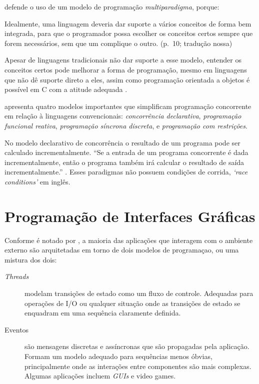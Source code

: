 \textcite{roy2009} defende o uso de um modelo de programação \emph{multiparadigma},
porque:

\begin{citacao}
  Idealmente, uma linguagem deveria dar suporte a vários conceitos de forma
  bem integrada, para que o programador possa escolher os conceitos certos
  sempre que forem necessários, sem que um complique o outro.
  (p.~10; tradução nossa)
\end{citacao}

Apesar de linguagens tradicionais não dar suporte a esse modelo, entender os
conceitos certos pode melhorar a forma de programação, mesmo em linguagens que
não dê suporte direto a eles, assim como programação orientada a objetos é
possível em C com a atitude adequada \cite{roy2009}.

\textcite{roy2009} apresenta quatro modelos importantes que simplificam
programação concorrente em relação à linguagens convencionais: \emph{concorrência
declarativa}, \emph{programação funcional reativa}, \emph{programação síncrona
discreta}, e \emph{programação com restrições}.

No modelo declarativo de concorrência o resultado de um programa pode ser
calculado incrementalmente.
“Se a entrada de um programa concorrente é dada incrementalmente, então o
programa também irá calcular o resultado de saída incrementalmente.”
\cite[p. 238; tradução nossa]{roy2004}.
Esses paradigmas não possuem condições de corrida, \emph{‘race conditions’} em
inglês.
\section{Programação de Interfaces Gráficas}
\label{sec:orgd07e721}

Conforme é notado por \textcite{blackheath2016}, a maioria das aplicações que
interagem com o ambiente externo são arquitetadas em torno de dois modelos de
programaçao, ou uma mistura dos dois:

\begin{description}
\item[{\emph{Threads}}] modelam transições de estado como um fluxo de controle.
Adequadas para operações de I/O ou qualquer situação onde as
transições de estado se enquadram em uma sequência claramente
definida.
\item[{Eventos}] são mensagens discretas e assíncronas que são propagadas pela
aplicação. Formam um modelo adequado para sequências menos
óbvias, principalmente onde as interações entre componentes são
mais complexas. Algumas aplicações incluem \emph{GUIs} e video
games.
\end{description}

